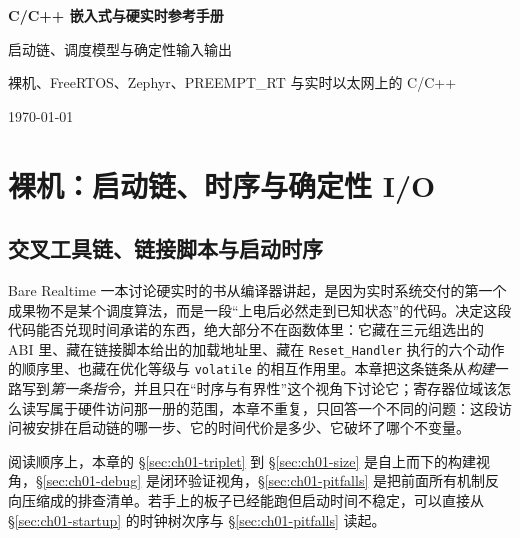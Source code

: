\documentclass[12pt,a4paper,fontset=fandol]{ctexbook}
\newcommand{\Tp}[1]{\texttt{#1}}
\newcommand{\Lang}[1]{\textsf{#1}}
\newcommand{\DomBare}{\Lang{Bare}}
\newcommand{\DomRT}{\Lang{Realtime}}
\begin{document}
\frontmatter

\begin{titlepage}
\centering
\vspace*{4cm}
{\Huge\bfseries C/C++ 嵌入式与硬实时参考手册\par}
\vspace{1cm}
{\LARGE 启动链、调度模型与确定性输入输出\par}
\vspace{0.4cm}
{\Large 裸机、FreeRTOS、Zephyr、PREEMPT\_RT 与实时以太网上的 C/C++\par}
\vfill
{\large \today\par}
\end{titlepage}

\tableofcontents

\mainmatter

\cleardoublepage


\part{裸机：启动链、时序与确定性 I/O}

\chapter{交叉工具链、链接脚本与启动时序}

\label{ch:ch01-toolchain-boot}

\DomBare{} \DomRT{} 一本讨论硬实时的书从编译器讲起，是因为实时系统交付的第一个成果物不是某个调度算法，而是一段``上电后必然走到已知状态''的代码。决定这段代码能否兑现时间承诺的东西，绝大部分不在函数体里：它藏在三元组选出的 ABI 里、藏在链接脚本给出的加载地址里、藏在 \Tp{Reset\_Handler} 执行的六个动作的顺序里、也藏在优化等级与 \Tp{volatile} 的相互作用里。本章把这条链条从\emph{构建}一路写到\emph{第一条指令}，并且只在``时序与有界性''这个视角下讨论它；寄存器位域该怎么读写属于硬件访问那一册的范围，本章不重复，只回答一个不同的问题：这段访问被安排在启动链的哪一步、它的时间代价是多少、它破坏了哪个不变量。

阅读顺序上，本章的 \S\ref{sec:ch01-triplet} 到 \S\ref{sec:ch01-size} 是自上而下的构建视角，\S\ref{sec:ch01-debug} 是闭环验证视角，\S\ref{sec:ch01-pitfalls} 是把前面所有机制反向压缩成的排查清单。若手上的板子已经能跑但启动时间不稳定，可以直接从 \S\ref{sec:ch01-startup} 的时钟树次序与 \S\ref{sec:ch01-pitfalls} 读起。
\end{document}
